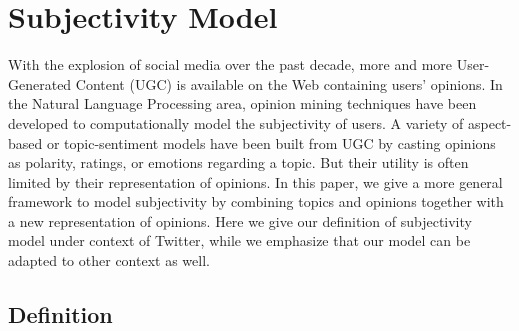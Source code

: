 \documentclass[letterpaper]{article}
\begin{document}
\section{Subjectivity Model}
\label{subjectivemodel}

With the explosion of social media over the past decade, more and more User-Generated Content (UGC) is available on the Web containing users' opinions.
In the Natural Language Processing area, opinion mining techniques\cite{liu2012sentiment} have been developed to computationally model the subjectivity of users. A variety of aspect-based or topic-sentiment models have been built from UGC by casting opinions as polarity, ratings, or emotions regarding a topic\cite{lek2013aspect,mei2007topic}. But their utility is often limited by their representation of opinions. In this paper, we give a more general framework to model subjectivity by combining topics and opinions together with a new representation of opinions. Here we give our definition of subjectivity model under context of Twitter, while we emphasize that our model can be adapted to other context as well.

\subsection{Definition}
\label{definition}
\end{document}
